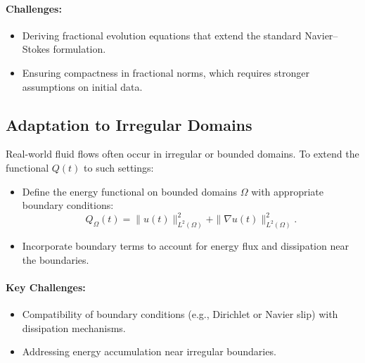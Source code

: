 \paragraph{Challenges:}
\begin{itemize}
    \item Deriving fractional evolution equations that extend the standard Navier--Stokes formulation.
    \item Ensuring compactness in fractional norms, which requires stronger assumptions on initial data.
\end{itemize}

\subsection{Adaptation to Irregular Domains}
Real-world fluid flows often occur in irregular or bounded domains. To extend the functional $Q(t)$ to such settings:
\begin{itemize}
    \item Define the energy functional on bounded domains $\Omega$ with appropriate boundary conditions:
    \[
    Q_\Omega(t) = \|u(t)\|_{L^2(\Omega)}^2 + \|\nabla u(t)\|_{L^2(\Omega)}^2.
    \]
    \item Incorporate boundary terms to account for energy flux and dissipation near the boundaries.
\end{itemize}

\paragraph{Key Challenges:}
\begin{itemize}
    \item Compatibility of boundary conditions (e.g., Dirichlet or Navier slip) with dissipation mechanisms.
    \item Addressing energy accumulation near irregular boundaries.
\end{itemize}

